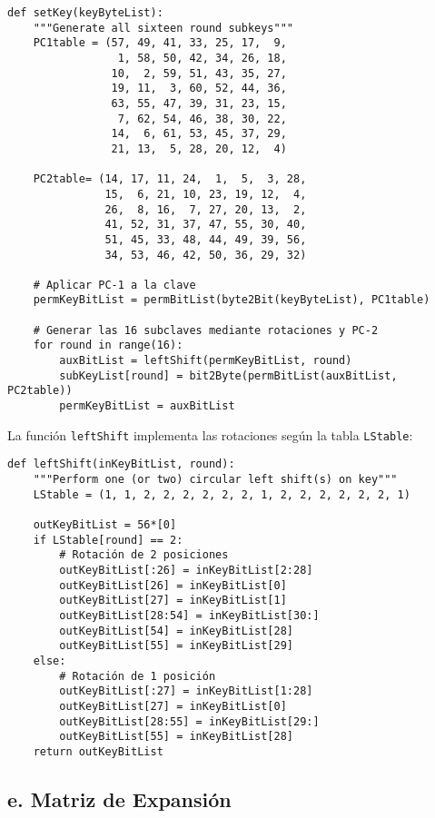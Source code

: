 \begin{lstlisting}[style=cryptoalgo]
def setKey(keyByteList):
    """Generate all sixteen round subkeys"""
    PC1table = (57, 49, 41, 33, 25, 17,  9,
                 1, 58, 50, 42, 34, 26, 18,
                10,  2, 59, 51, 43, 35, 27,
                19, 11,  3, 60, 52, 44, 36,
                63, 55, 47, 39, 31, 23, 15,
                 7, 62, 54, 46, 38, 30, 22,
                14,  6, 61, 53, 45, 37, 29,
                21, 13,  5, 28, 20, 12,  4)

    PC2table= (14, 17, 11, 24,  1,  5,  3, 28,
               15,  6, 21, 10, 23, 19, 12,  4,
               26,  8, 16,  7, 27, 20, 13,  2,
               41, 52, 31, 37, 47, 55, 30, 40,
               51, 45, 33, 48, 44, 49, 39, 56,
               34, 53, 46, 42, 50, 36, 29, 32)

    # Aplicar PC-1 a la clave
    permKeyBitList = permBitList(byte2Bit(keyByteList), PC1table)

    # Generar las 16 subclaves mediante rotaciones y PC-2
    for round in range(16):
        auxBitList = leftShift(permKeyBitList, round)
        subKeyList[round] = bit2Byte(permBitList(auxBitList, PC2table))
        permKeyBitList = auxBitList
\end{lstlisting}

La función \texttt{leftShift} implementa las rotaciones según la tabla \texttt{LStable}:

\begin{lstlisting}[style=cryptoalgo]
def leftShift(inKeyBitList, round):
    """Perform one (or two) circular left shift(s) on key"""
    LStable = (1, 1, 2, 2, 2, 2, 2, 2, 1, 2, 2, 2, 2, 2, 2, 1)

    outKeyBitList = 56*[0]
    if LStable[round] == 2:
        # Rotación de 2 posiciones
        outKeyBitList[:26] = inKeyBitList[2:28]
        outKeyBitList[26] = inKeyBitList[0]
        outKeyBitList[27] = inKeyBitList[1]
        outKeyBitList[28:54] = inKeyBitList[30:]
        outKeyBitList[54] = inKeyBitList[28]
        outKeyBitList[55] = inKeyBitList[29]
    else:
        # Rotación de 1 posición
        outKeyBitList[:27] = inKeyBitList[1:28]
        outKeyBitList[27] = inKeyBitList[0]
        outKeyBitList[28:55] = inKeyBitList[29:]
        outKeyBitList[55] = inKeyBitList[28]
    return outKeyBitList
\end{lstlisting}

\subsection{e. Matriz de Expansión}

